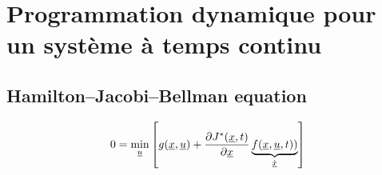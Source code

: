 \newpage
\section{Programmation dynamique pour un système à temps continu}
\label{sec:dp_cont}

\subsection{Hamilton–Jacobi–Bellman equation}

\begin{align}
0 =
\operatornamewithlimits{min}\limits_{\col{u}}
\left[
g(\col{x} , \col{u} ) + \frac{\partial	J^*(\col{x},t)}{\partial \col{x} }
\underbrace{
f(\col{x} , \col{u} , t) )
}_{\dot{\col{x}}}
\right]
\label{eq:hjb}
\end{align} 
